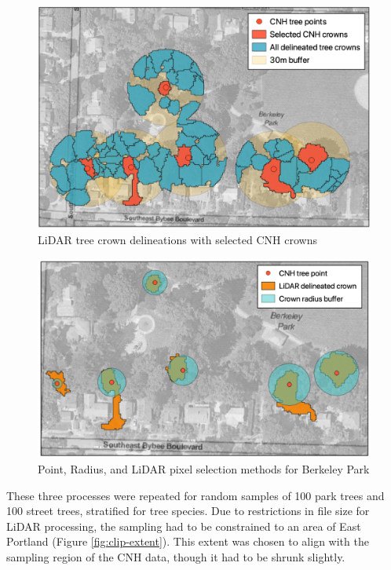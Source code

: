 \documentclass[12pt,twoside]{reedthesis}
\begin{document}
\begin{figure}[H]

{\centering \includegraphics[width=0.8\linewidth,]{figure/selected_lidar} 

}

\caption{LiDAR tree crown delineations with selected CNH crowns}\label{fig:unnamed-chunk-4}
\end{figure}
\begin{figure}[H]

{\centering \includegraphics[width=0.9\linewidth,]{figure/layered_outputs} 

}

\caption[Pixel selection method comparison]{Point, Radius, and LiDAR pixel selection methods for Berkeley Park}\label{fig:layered-outputs}
\end{figure}
These three processes were repeated for random samples of 100 park trees
and 100 street trees, stratified for tree species. Due to restrictions
in file size for LiDAR processing, the sampling had to be constrained to
an area of East Portland (Figure \ref{fig:clip-extent}). This extent
was chosen to align with the sampling region of the CNH data, though it
had to be shrunk slightly.
\end{document}
